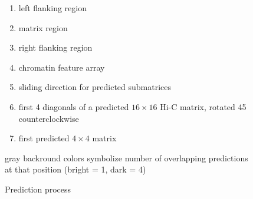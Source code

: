 \begin{figure}
 \begin{minipage}{0.65\textwidth}
    \caption{Prediction process}
    \label{fig:methods:prediction}
 \end{minipage}\hfill
 \begin{minipage}{0.3\textwidth}
 \scriptsize
  \begin{enumerate}[label=\Alph*:,leftmargin=*]
   \raggedright
    \item left flanking region
    \item matrix region
    \item right flanking region
    \item chromatin feature array
    \item sliding direction for predicted submatrices
    \item first 4 diagonals of a predicted $16\times16$ Hi-C matrix, rotated \SI{45}{\deg} counterclockwise
    \item first predicted $4\times4$ matrix
\end{enumerate}
\raggedright{gray backround colors symbolize number of overlapping predictions at that position (bright = 1, dark = 4)}
 \end{minipage}
\end{figure}

